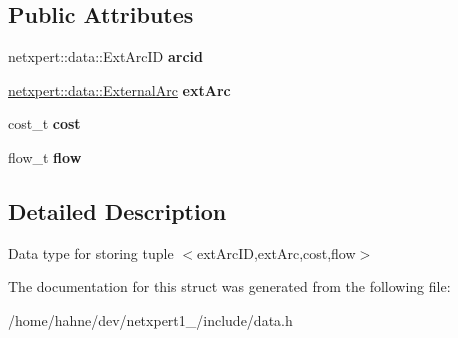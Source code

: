 \subsection*{Public Attributes}
\begin{DoxyCompactItemize}
\item 
netxpert\+::data\+::\+Ext\+Arc\+ID {\bfseries arcid}\hypertarget{structnetxpert_1_1data_1_1ExtDistributionArc_a14b932c73adc34dd6cfb3cdbb39c6e95}{}\label{structnetxpert_1_1data_1_1ExtDistributionArc_a14b932c73adc34dd6cfb3cdbb39c6e95}

\item 
\hyperlink{structnetxpert_1_1data_1_1ExternalArc}{netxpert\+::data\+::\+External\+Arc} {\bfseries ext\+Arc}\hypertarget{structnetxpert_1_1data_1_1ExtDistributionArc_af4d9999cd6bbad0b55912f65911d0938}{}\label{structnetxpert_1_1data_1_1ExtDistributionArc_af4d9999cd6bbad0b55912f65911d0938}

\item 
cost\+\_\+t {\bfseries cost}\hypertarget{structnetxpert_1_1data_1_1ExtDistributionArc_a8c7c744b4dd482a8968299edaaa25cdf}{}\label{structnetxpert_1_1data_1_1ExtDistributionArc_a8c7c744b4dd482a8968299edaaa25cdf}

\item 
flow\+\_\+t {\bfseries flow}\hypertarget{structnetxpert_1_1data_1_1ExtDistributionArc_ad42ca648414668690de6b3c12dceba7b}{}\label{structnetxpert_1_1data_1_1ExtDistributionArc_ad42ca648414668690de6b3c12dceba7b}

\end{DoxyCompactItemize}


\subsection{Detailed Description}
Data type for storing tuple $<$ext\+Arc\+ID,ext\+Arc,cost,flow$>$ 

The documentation for this struct was generated from the following file\+:\begin{DoxyCompactItemize}
\item 
/home/hahne/dev/netxpert1\+\_/include/data.\+h\end{DoxyCompactItemize}
